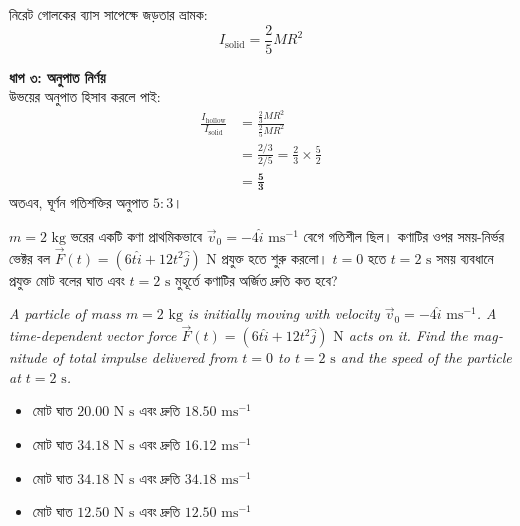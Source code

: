 \documentclass[12pt, a4paper]{article}
\begin{document}
{\begin{tcolorbox}[solutionbox={সমাধান (Solution)}]
    নিরেট গোলকের ব্যাস সাপেক্ষে জড়তার ভ্রামক:
    \[ I_{\text{solid}} = \frac{2}{5} M R^2 \]
    
    \vspace{0.5em}
    \noindent\textbf{ধাপ ৩: অনুপাত নির্ণয়} \\
    উভয়ের অনুপাত হিসাব করলে পাই:
    \begin{align*}
        \frac{I_{\text{hollow}}}{I_{\text{solid}}} &= \frac{\frac{2}{3} M R^2}{\frac{2}{5} M R^2} \\
        &= \frac{2/3}{2/5} = \frac{2}{3} \times \frac{5}{2} \\
        &= \mathbf{\frac{5}{3}}
    \end{align*}
    অতএব, ঘূর্ণন গতিশক্তির অনুপাত $5 : 3$।
\end{tcolorbox}

\newpage

\begin{tcolorbox}[questionbox={প্রশ্ন (Question) 11}]
\noindent
$m = 2\text{ kg}$ ভরের একটি কণা প্রাথমিকভাবে $\vec{v}_0 = -4\hat{i}\text{ ms}^{-1}$ বেগে গতিশীল ছিল। কণাটির ওপর সময়-নির্ভর ভেক্টর বল $\vec{F}(t) = (6t\hat{i} + 12t^2\hat{j})\text{ N}$ প্রযুক্ত হতে শুরু করলো। $t = 0$ হতে $t = 2\text{ s}$ সময় ব্যবধানে প্রযুক্ত মোট বলের ঘাত এবং $t = 2\text{ s}$ মুহূর্তে কণাটির অর্জিত দ্রুতি কত হবে?
\vspace{0.8em}
\begin{english}
\noindent\textit{\color{darkgray}
A particle of mass $m = 2\text{ kg}$ is initially moving with velocity $\vec{v}_0 = -4\hat{i}\text{ ms}^{-1}$. A time-dependent vector force $\vec{F}(t) = (6t\hat{i} + 12t^2\hat{j})\text{ N}$ acts on it. Find the magnitude of total impulse delivered from $t = 0$ to $t = 2\text{ s}$ and the speed of the particle at $t = 2\text{ s}$.
}
\end{english}
\end{tcolorbox}

\begin{itemize}[label={}, leftmargin=1cm, itemsep=0.5em]
\item[\textbf{A)}] মোট ঘাত $20.00\text{ N s}$ এবং দ্রুতি $18.50\text{ ms}^{-1}$
\item[\textbf{B)}] মোট ঘাত $34.18\text{ N s}$ এবং দ্রুতি $16.12\text{ ms}^{-1}$
\item[\textbf{C)}] মোট ঘাত $34.18\text{ N s}$ এবং দ্রুতি $34.18\text{ ms}^{-1}$
\item[\textbf{D)}] মোট ঘাত $12.50\text{ N s}$ এবং দ্রুতি $12.50\text{ ms}^{-1}$
\end{itemize}
\vspace{0.5em}

}
\end{document}
